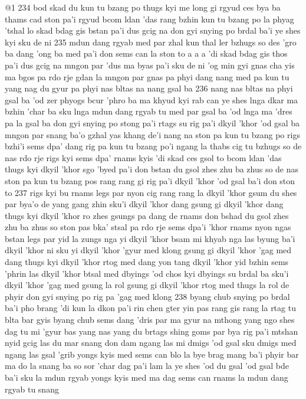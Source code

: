 @1
234
bod skad du
kun tu bzang po thugs kyi me long gi rgyud ces bya ba
thams cad ston pa'i rgyud
bcom ldan 'das rang bzhin kun tu bzang po la phyag 'tshal lo
skad bdag gis bstan pa'i dus gcig na
don gyi snying po brdal ba'i ye shes kyi sku de ni
235
mdun dang rgyab med par zhal kun thal ler bzhugs so
des 'gro ba dang 'ong ba med pa'i don sems can la ston to
a a a
'di skad bdag gis thos pa'i dus gcig na
mngon par 'dus ma byas pa'i sku de ni 'og min gyi gnas cha yis ma bgos pa rdo rje gdan la mngon par gnas pa
phyi dang nang med pa kun tu yang nag du gyur pa
phyi nas bltas na nang gsal ba
236
nang nas bltas na phyi gsal ba
'od zer phyogs bcur 'phro ba
ma khyud kyi rab can
ye shes lnga dkar ma bzhin 'char ba
sku lnga mdun dang rgyab tu med par gsal ba
'od lnga ma 'dres pa la gsal ba
don gyi snying po stong pa'i rtags su
rig pa'i dkyil 'khor 'od gsal ba
mngon par snang ba'o
gzhal yas khang de'i nang na ston pa kun tu bzang po
rigs bzhi'i sems dpa' dang
rig pa kun tu bzang po'i ngang la thabs cig tu bzhugs so
de nas rdo rje rigs kyi sems dpa' rnams kyis 'di skad ces gsol to
bcom ldan 'das thugs kyi dkyil 'khor sgo 'byed pa'i don bstan du gsol
zhes zhu ba zhus so
de nas ston pa kun tu bzang pos
rang rang gi rig pa'i dkyil 'khor 'od gsal ba'i don ston to
237
rigs kyi bu rnams legs par nyon cig
rang rang la dkyil 'khor gsum du shes par bya'o
de yang gang zhin
sku'i dkyil 'khor dang
gsung gi dkyil 'khor dang
thugs kyi dkyil 'khor ro
zhes gsungs pa dang
de rnams don bshad du gsol zhes zhu ba zhus so
ston pas bka' stsal pa
rdo rje sems dpa'i 'khor rnams nyon
ngas bstan legs par yid la zungs
nga yi dkyil 'khor bsam mi khyab
nga las byung ba'i dkyil 'khor ni
sku yi dkyil 'khor 'gyur med klong
gsung gi dkyil 'khor 'gag med dang
thugs kyi dkyil 'khor rtog med dang
yon tang dkyil 'khor yid bzhin sems
'phrin las dkyil 'khor btsal med dbyings
'od chos kyi dbyings su brdal ba
sku'i dkyil 'khor 'gag med gsung la rol
gsung gi dkyil 'khor rtog med thugs la rol
de phyir don gyi snying po rig pa 'gag med klong
238
byang chub snying po brdal ba'i pho brang 'di
kun la dkon pa'i rin chen gter yin pas
rang gis rang la rtag tu blta bar gyis
byang chub sems dang 'dris par ma gyur na
mthong yang ngo shes dag tu mi 'gyur bas
yang nas yang du brtags shing goms par bya
rig pa'i mtshan nyid gcig las du mar snang
don dam ngang las mi dmigs 'od gsal sku
dmigs med ngang las gsal 'grib yongs kyis med
sems can blo la bye brag mang ba'i phyir
bar ma do la snang ba so sor 'char
dag pa'i lam la ye shes 'od du gsal
'od gsal bde ba'i sku la mdun rgyab yongs kyis med
ma dag sems can rnams la mdun dang rgyab tu snang
